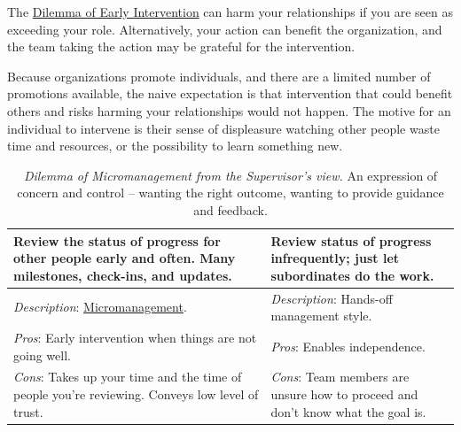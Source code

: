 The \hyperref[table:dilemma-personal-early-intervention]{Dilemma of Early Intervention} can harm your relationships if you are seen as exceeding your role. Alternatively, your action can benefit the organization, and the team taking the action may be grateful for the intervention. 

Because organizations promote individuals, and there are a limited number of promotions available, the naive expectation is that intervention that could benefit others and risks harming your relationships would not happen. The motive for an individual to intervene is their sense of displeasure watching other people waste time and resources, or the possibility to learn something new.


\begin{center}
\begin{table}[H] %
\begin{tabular}{ | m{\dilemmatablewidth}| m{\dilemmatablewidth} | } 
  \hline
  \textbf{Review the status of progress for other people early and often. Many milestones, check-ins, and updates.} &
  \textbf{Review status of progress infrequently; just let subordinates do the work.} \\
  \hline
  \textit{Description}: \href{https://en.wikipedia.org/wiki/Micromanagement}{Micromanagement}. 
  \index{Wikipedia!\href{https://en.wikipedia.org/wiki/Micromanagement}{Micromanagement}}
  & 
  \textit{Description}: Hands-off management style. \\
  \hline
  \textit{Pros}: Early intervention when things are not going well. & 
  \textit{Pros}: Enables independence. \\
  \hline
  \textit{Cons}: Takes up your time and the time of people you're reviewing. Conveys low level of trust. & 
  \textit{Cons}: Team members are unsure how to proceed and don't know what the goal is. \\
  \hline
\end{tabular}
\caption{\textit{Dilemma of Micromanagement from the Supervisor's view.}
An expression of concern and control -- wanting the right outcome, wanting to provide guidance and feedback. 
}
\label{table:dilemma-personal-manager-micromanaging}
\end{table}
\end{center}

